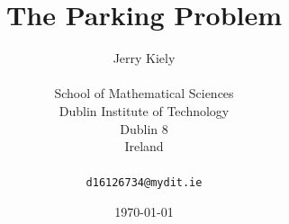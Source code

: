 \documentclass{report}
\begin{document}
\title{The Parking Problem}
\author{Jerry Kiely\\
	\\
	School of Mathematical Sciences\\
	Dublin Institute of Technology\\
	Dublin 8\\
	Ireland\\
	\\
	\texttt{d16126734@mydit.ie}}
\date{\today}
\maketitle



\tableofcontents


\newpage



    \listoffigures

    \listoftables

	\lstlistoflistings




\newpage
\end{document}
